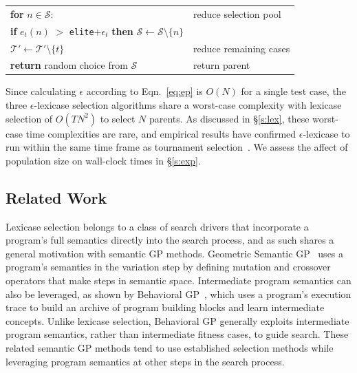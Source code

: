 \documentclass[twoside]{article}
\newcommand{\edit}[1]{{\color{red} #1}}
\begin{document}
\begin{algorithm}
{\begin{tabularx}{\textwidth}{lX}
\hspace{1em}\hspace{1em}	\textbf{for} $n \in \mathcal{S}$: 	&	\hspace{1em}reduce selection pool\\
\hspace{1em}\hspace{1em}\hspace{1em}	 \textbf{if} $e_t(n)$ $>$ \texttt{elite}$+\epsilon_{t}$ \textbf{then}	$\mathcal{S} \leftarrow \mathcal{S} \setminus \{n\}$	 \\
\hspace{1em}\hspace{1em}	$\mathcal{T'} \leftarrow \mathcal{T'} \setminus \{t\}$				&	\hspace{1em}reduce remaining cases\\
\hspace{1em} \textbf{return} random choice from $\mathcal{S}$															&	return parent  
\end{tabularx}
}
\end{algorithm}

Since calculating $\epsilon$ according to Eqn.~\ref{eq:ep} is $O(N)$ for a single test case, the three $\epsilon$-lexicase selection algorithms share a worst-case complexity with lexicase selection of $O(TN^2)$ to select $N$ parents. As discussed in \S\ref{s:lex}, these worst-case time complexities are rare, and empirical results have confirmed $\epsilon$-lexicase to run within the same time frame as tournament selection~\citep{la_cava_epsilon-lexicase_2016}. We assess the affect of population size on wall-clock times in \S\ref{s:exp}. %

\subsection{Related Work}\label{s:rw}

\edit{Lexicase selection belongs to a class of search drivers that incorporate a program's full semantics directly into the search process, and as such shares a general motivation with semantic GP methods. Geometric Semantic GP~\citep{moraglio_geometric_2012} uses a program's semantics in the variation step by defining mutation and crossover operators that make steps in semantic space. Intermediate program semantics can also be leveraged, as shown by Behavioral GP~\citep{krawiec_behavioral_2014}, which uses a program's execution trace to build an archive of program building blocks and learn intermediate concepts. Unlike lexicase selection, Behavioral GP generally exploits intermediate program semantics, rather than intermediate fitness cases, to guide search. These related semantic GP methods tend to use established selection methods while leveraging program semantics at other steps in the search process. }
\end{document}
